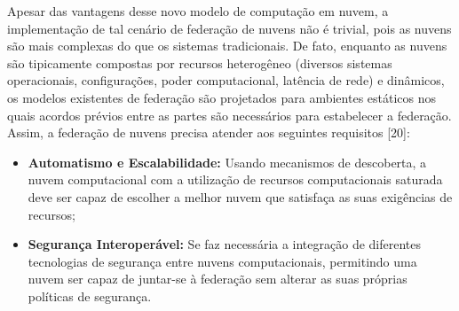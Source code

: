 Apesar das vantagens desse novo modelo de computação em nuvem, a implementação de tal cenário de federação de nuvens não é trivial, pois as nuvens são mais complexas do que os sistemas tradicionais. De fato, enquanto as nuvens são tipicamente compostas por recursos heterogêneo (diversos sistemas operacionais, configurações, poder computacional, latência de rede) e dinâmicos, os modelos existentes de federação são projetados para ambientes estáticos nos quais acordos prévios entre as partes são necessários para estabelecer a federação. Assim, a federação de nuvens precisa atender aos seguintes requisitos [20]:

\begin{itemize}
	\item \textbf{Automatismo e Escalabilidade:} Usando mecanismos de descoberta, a nuvem computacional com a utilização de recursos computacionais saturada deve ser capaz de escolher a melhor nuvem que satisfaça as suas exigências de recursos;
    \item \textbf{Segurança Interoperável:} Se faz necessária a integração de diferentes tecnologias de segurança entre nuvens computacionais, permitindo uma nuvem ser capaz de juntar-se à federação sem alterar as suas próprias políticas de segurança.
\end{itemize}



